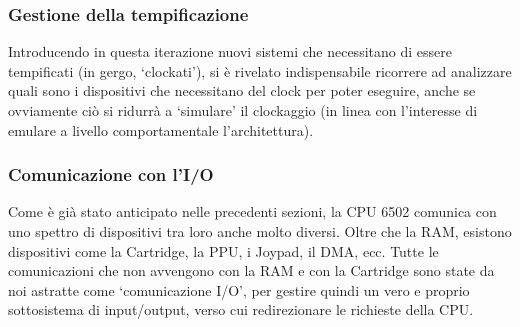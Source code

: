 \documentclass[11pt]{article}
\begin{document}
\subsubsection{Gestione della tempificazione}
Introducendo in questa iterazione nuovi sistemi che necessitano di essere tempificati (in gergo, `clockati'), si è rivelato indispensabile ricorrere ad analizzare quali sono i dispositivi che necessitano del clock per poter eseguire, anche se ovviamente ciò si ridurrà a `simulare' il clockaggio (in linea con l'interesse di emulare a livello comportamentale l'architettura).

\subsubsection{Comunicazione con l'I/O}
Come è già stato anticipato nelle precedenti sezioni, la CPU 6502 comunica con uno spettro di dispositivi tra loro anche molto diversi. Oltre che la RAM, esistono dispositivi come la Cartridge, la PPU, i Joypad, il DMA, ecc. Tutte le comunicazioni che non avvengono con la RAM e con la Cartridge sono state da noi astratte come `comunicazione I/O', per gestire quindi un vero e proprio sottosistema di input/output, verso cui redirezionare le richieste della CPU. 
\end{document}
